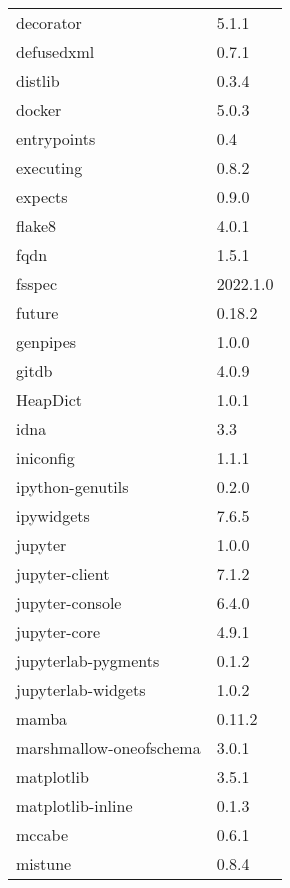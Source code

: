 \begin{table}[h]
\begin{tabular}{|l|l|}
    decorator                    & 5.1.1     \\
    defusedxml                   & 0.7.1     \\
    distlib                      & 0.3.4     \\
    docker                       & 5.0.3     \\
    entrypoints                  & 0.4       \\
    executing                    & 0.8.2     \\
    expects                      & 0.9.0     \\
    flake8                       & 4.0.1     \\
    fqdn                         & 1.5.1     \\
    fsspec                       & 2022.1.0  \\
    future                       & 0.18.2    \\
    genpipes                     & 1.0.0     \\
    gitdb                        & 4.0.9     \\
    HeapDict                     & 1.0.1     \\
    idna                         & 3.3       \\
    iniconfig                    & 1.1.1     \\
    ipython-genutils             & 0.2.0     \\
    ipywidgets                   & 7.6.5     \\
    jupyter                      & 1.0.0     \\
    jupyter-client               & 7.1.2     \\
    jupyter-console              & 6.4.0     \\
    jupyter-core                 & 4.9.1     \\
    jupyterlab-pygments          & 0.1.2     \\
    jupyterlab-widgets           & 1.0.2     \\
    mamba                        & 0.11.2    \\
    marshmallow-oneofschema      & 3.0.1     \\
    matplotlib                   & 3.5.1     \\
    matplotlib-inline            & 0.1.3     \\
    mccabe                       & 0.6.1     \\
    mistune                      & 0.8.4     \\

\end{tabular}
\end{table}
